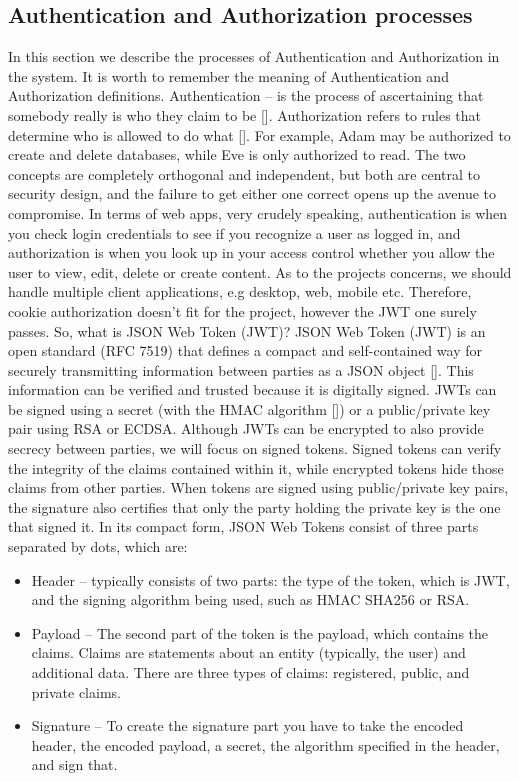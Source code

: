 \subsection{Authentication and Authorization processes}\label{subsec:authentication-and-authorization-processes}
In this section we describe the processes of Authentication and Authorization in the system.
It is worth to remember the meaning of Authentication and Authorization definitions.
Authentication -- is the process of ascertaining that somebody really is who they claim to be [\cite{burrows1989logic}].
Authorization refers to rules that determine who is allowed to do what [\cite{fagin1978authorization}].
For example, Adam may be authorized to create and delete databases, while Eve is only authorized to read.
The two concepts are completely orthogonal and independent, but both are central to security design, and the
failure to get either one correct opens up the avenue to compromise.
In terms of web apps, very crudely speaking, authentication is when you check login credentials to see if you recognize
a user as logged in, and authorization is when you look up in your access control whether you allow the user to view,
edit, delete or create content.
As to the projects concerns, we should handle multiple client applications, e.g desktop, web, mobile etc.
Therefore, cookie authorization doesn't fit for the project, however the JWT one surely passes.
So, what is JSON Web Token (JWT)?
JSON Web Token (JWT) is an open standard (RFC 7519) that defines a compact and self-contained way for securely
transmitting information between parties as a JSON object [\cite{jones2015json}].
This information can be verified and trusted because it is digitally signed.
JWTs can be signed using a secret (with the HMAC algorithm [\cite{wang2004hmac}]) or a public/private key pair using RSA or ECDSA\@.
Although JWTs can be encrypted to also provide secrecy between parties, we will focus on signed tokens.
Signed tokens can verify the integrity of the claims contained within it, while encrypted tokens hide those claims from
other parties.
When tokens are signed using public/private key pairs, the signature also certifies that only the party holding the
private key is the one that signed it.
In its compact form, JSON Web Tokens consist of three parts separated by dots, which are:
\begin{itemize}
    \item Header -- typically consists of two parts: the type of the token, which is JWT, and the signing algorithm
    being used, such as HMAC SHA256 or RSA\@.
    \item Payload -- The second part of the token is the payload, which contains the claims.
    Claims are statements about an entity (typically, the user) and additional data.
    There are three types of claims: registered, public, and private claims.
    \item Signature -- To create the signature part you have to take the encoded header, the encoded payload, a secret,
    the algorithm specified in the header, and sign that.
\end{itemize}
